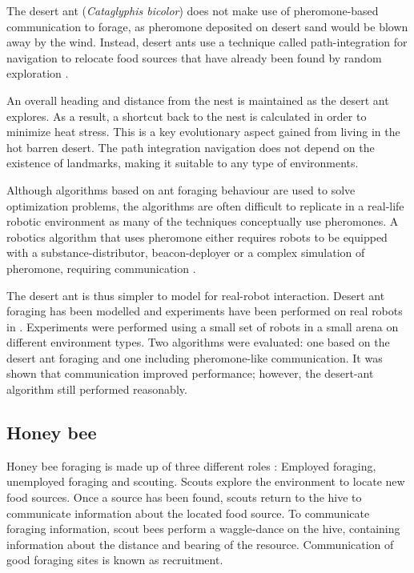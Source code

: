 The desert ant (\textit{Cataglyphis bicolor}) does not make use of pheromone-based communication to forage, as pheromone deposited on desert sand would be blown away by the wind. Instead, desert ants use a technique called path-integration for navigation to relocate food sources that have already been found by random exploration \cite{collett1998local}. 

An overall heading and distance from the nest is maintained as the desert ant explores. As a result, a shortcut back to the nest is calculated in order to minimize heat stress. This is a key evolutionary aspect gained from living in the hot barren desert. The path integration navigation does not depend on the existence of landmarks, making it suitable to any type of environments. 

Although algorithms based on ant foraging behaviour are used to solve optimization problems, the algorithms are often difficult to replicate in a real-life robotic environment as many of the techniques conceptually use pheromones.  A robotics algorithm that uses pheromone either requires robots to be equipped with a substance-distributor, beacon-deployer or a complex simulation of pheromone, requiring communication \cite{hoff2010two}.


The desert ant is thus simpler to model for real-robot interaction. Desert ant foraging has been modelled and experiments have been performed on real robots in \cite{hecker2012formica}. Experiments were performed using a small set of robots in a small arena on different environment types. Two algorithms were evaluated: one based on the desert ant foraging and one including pheromone-like communication. It was shown that communication improved performance; however, the desert-ant algorithm still performed reasonably. 


\subsection{Honey bee}

Honey bee foraging is made up of three different roles \cite{seeley2009wisdom}: Employed foraging, unemployed foraging and scouting. Scouts explore the environment to locate new food sources. Once a source has been found, scouts return to the hive to communicate information about the located food source. To communicate foraging information, scout bees perform a waggle-dance on the hive, containing information about the distance and bearing of the resource. Communication of good foraging sites is known as recruitment. 

